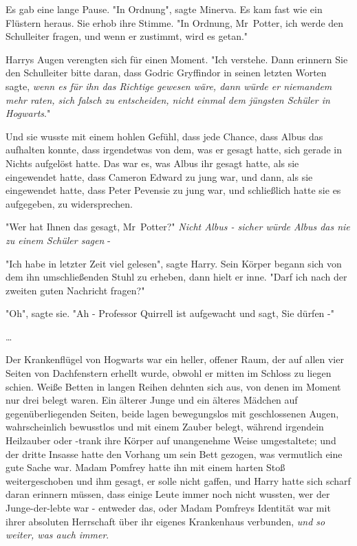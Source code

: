 {Es gab eine lange Pause. "In Ordnung", sagte Minerva. Es kam fast wie ein Flüstern heraus. Sie erhob ihre Stimme. "In Ordnung, Mr~Potter, ich werde den Schulleiter fragen, und wenn er zustimmt, wird es getan."

Harrys Augen verengten sich für einen Moment. "Ich verstehe. Dann erinnern Sie den Schulleiter bitte daran, dass Godric Gryffindor in seinen letzten Worten sagte, \emph{wenn es für ihn das Richtige gewesen wäre, dann würde er niemandem mehr raten, sich falsch zu entscheiden, nicht einmal dem jüngsten Schüler in Hogwarts}."

Und sie wusste mit einem hohlen Gefühl, dass jede Chance, dass Albus das aufhalten konnte, dass irgendetwas von dem, was er gesagt hatte, sich gerade in Nichts aufgelöst hatte. Das war es, was Albus ihr gesagt hatte, als sie eingewendet hatte, dass Cameron Edward zu jung war, und dann, als sie eingewendet hatte, dass Peter Pevensie zu jung war, und schließlich hatte sie es aufgegeben, zu widersprechen.

"Wer hat Ihnen das gesagt, Mr~Potter?" \emph{Nicht Albus - sicher würde Albus das nie zu einem Schüler sagen} -

"Ich habe in letzter Zeit viel gelesen", sagte Harry. Sein Körper begann sich von dem ihn umschließenden Stuhl zu erheben, dann hielt er inne. "Darf ich nach der zweiten guten Nachricht fragen?"

"Oh", sagte sie. "Ah - Professor Quirrell ist aufgewacht und sagt, Sie dürfen -"

…

Der Krankenflügel von Hogwarts war ein heller, offener Raum, der auf allen vier Seiten von Dachfenstern erhellt wurde, obwohl er mitten im Schloss zu liegen schien. Weiße Betten in langen Reihen dehnten sich aus, von denen im Moment nur drei belegt waren. Ein älterer Junge und ein älteres Mädchen auf gegenüberliegenden Seiten, beide lagen bewegungslos mit geschlossenen Augen, wahrscheinlich bewusstlos und mit einem Zauber belegt, während irgendein Heilzauber oder -trank ihre Körper auf unangenehme Weise umgestaltete; und der dritte Insasse hatte den Vorhang um sein Bett gezogen, was vermutlich eine gute Sache war. Madam Pomfrey hatte ihn mit einem harten Stoß weitergeschoben und ihm gesagt, er solle nicht gaffen, und Harry hatte sich scharf daran erinnern müssen, dass einige Leute immer noch nicht wussten, wer der Junge-der-lebte war - entweder das, oder Madam Pomfreys Identität war mit ihrer absoluten Herrschaft über ihr eigenes Krankenhaus verbunden, \emph{und so weiter, was auch immer}.

}
